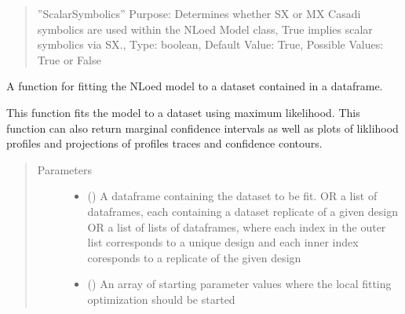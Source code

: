 \documentclass[letterpaper,10pt,english,openany,oneside]{sphinxmanual}
\begin{document}
\begin{fulllineitems}
\begin{fulllineitems}
\begin{quote}
\begin{description}
\begin{itemize}
”ScalarSymbolics” \textendash{}
Purpose: Determines whether SX or MX Casadi symbolics are used within the NLoed Model
class, True implies scalar symbolics via SX.,
Type: boolean,
Default Value: True,
Possible Values: True or False


\end{itemize}

\end{description}\end{quote}

\end{fulllineitems}


\begin{fulllineitems}
\label{\detokenize{nloed:nloed.model.Model.fit}}
A function for fitting the NLoed model to a dataset contained in a dataframe.

This function fits the model to a dataset using maximum likelihood. This function can also
return marginal confidence intervals as well as plots of liklihood profiles and projections
of profiles traces and confidence contours.
\begin{quote}\begin{description}
\item[{Parameters}] \leavevmode\begin{itemize}
\item {} 
 () \textendash{} A dataframe containing the dataset to be fit.
OR a list of dataframes, each containing a dataset replicate of a given design
OR a list of lists of dataframes, where each index in the outer list corresponds
to a unique design and each inner index coresponds to a replicate of the given design

\item {} 
 (\sphinxstyleliteralemphasis{\sphinxupquote{, }}) \textendash{} An array of starting parameter values where the
local fitting optimization should be started


\end{itemize}
\end{description}
\end{quote}
\end{fulllineitems}
\end{fulllineitems}
\end{document}
